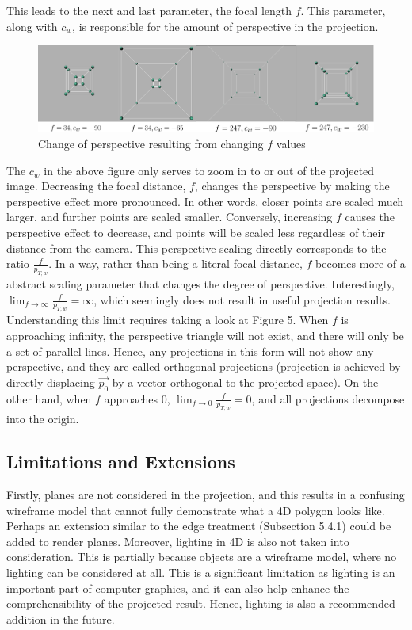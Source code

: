 \documentclass[12pt, letterpaper]{article}
\begin{document}
This leads to the next and last parameter, the focal length $f$. This parameter, along with $c_w$, is responsible for the amount of perspective in the projection. 
\begin{figure}[H]
\centering
\includegraphics[width=17cm]{f_diagram.png}
\caption{Change of perspective resulting from changing $f$ values}
\label{fig:figure}
\end{figure}
The $c_w$ in the above figure only serves to zoom in to or out of the projected image. Decreasing the focal distance, $f$, changes the perspective by making the perspective effect more pronounced. In other words, closer points are scaled much larger, and further points are scaled smaller. Conversely, increasing $f$ causes the perspective effect to decrease, and points will be scaled less regardless of their distance from the camera. This perspective scaling directly corresponds to the ratio $\frac{f}{p_{T,w}}$. In a way, rather than being a literal focal distance, $f$ becomes more of a abstract scaling parameter that changes the degree of perspective. Interestingly, $\lim_{f\to\infty}\frac{f}{p_{T,w}} = \infty$, which seemingly does not result in useful projection results. Understanding this limit requires taking a look at Figure 5. When $f$ is approaching infinity, the perspective triangle will not exist, and there will only be a set of parallel lines. Hence, any projections in this form will not show any perspective, and they are called orthogonal projections (projection is achieved by directly displacing $\vec{p_0}$ by a vector orthogonal to the projected space). On the other hand, when $f$ approaches 0, $\lim_{f\to 0}\frac{f}{p_{T,w}} = 0$, and all projections decompose into the origin. 

\subsection{Limitations and Extensions}
 Firstly, planes are not considered in the projection, and this results in a confusing wireframe model that cannot fully demonstrate what a 4D polygon looks like. Perhaps an extension similar to the edge treatment (Subsection 5.4.1) could be added to render planes. Moreover, lighting in 4D is also not taken into consideration. This is partially because objects are a wireframe model, where no lighting can be considered at all. This is a significant limitation as lighting is an important part of computer graphics, and it can also help enhance the comprehensibility of the projected result. Hence, lighting is also a recommended addition in the future. 
\end{document}
